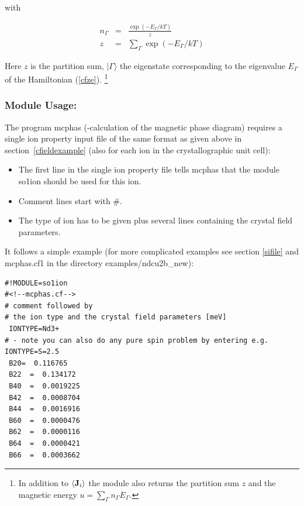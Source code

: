 with 

\begin{eqnarray}
n_{\Gamma}&=&\frac{\exp(-E_{\Gamma}/kT)}{z}\\
z&=&\sum_{\Gamma} \exp(-E_{\Gamma}/kT)
\end{eqnarray}

Here $z$ is the partition sum, $|\Gamma\rangle$ the eigenstate corresponding to
the eigenvalue $E_{\Gamma}$ of the Hamiltonian (\ref{cfze}). 
\footnote{In addition to $\langle \mathbf J_i \rangle$ the module also returns
the partition sum $z$ and the magnetic energy $u=\sum_{\Gamma} n_{\Gamma} E_{\Gamma}$.}

\subsubsection{Module Usage:}
 

The program {\prg mcphas} (-calculation of the magnetic phase diagram) 
requires a single ion
property input file of the same format as given above in
section~\ref{cfieldexample} (also for each ion in the
crystallographic unit cell):

\begin{itemize}
\item The first line in the single ion property file tells {\prg mcphas} that the module
{\prg so1ion} should be used for this ion. 
\item Comment lines start with \#. 
\item The type of ion has to be given plus
several lines containing the crystal field parameters. 
\end{itemize}

It follows a simple  example (for more complicated examples see section \ref{sifile} and 
{\prg mcphas.cf1} in the 
directory {\prg examples/ndcu2b\_new}):


\begin{verbatim}
#!MODULE=so1ion
#<!--mcphas.cf-->
# comment followed by
# the ion type and the crystal field parameters [meV]
 IONTYPE=Nd3+
# - note you can also do any pure spin problem by entering e.g. IONTYPE=S=2.5 
 B20=  0.116765                                           
 B22  =  0.134172                                           
 B40  =  0.0019225                                          
 B42  =  0.0008704                                          
 B44  =  0.0016916                                          
 B60  =  0.0000476                                          
 B62  =  0.0000116                                          
 B64  =  0.0000421                                          
 B66  =  0.0003662                                          
\end{verbatim}


